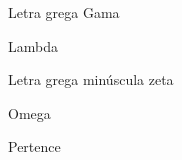 \begin{simbolos}
  \item[$ \Gamma $] Letra grega Gama
  \item[$ \Lambda $] Lambda
  \item[$ \zeta $] Letra grega minúscula zeta
  \item[$ \Omega $] Omega
  \item[$ \in $] Pertence
\end{simbolos}
